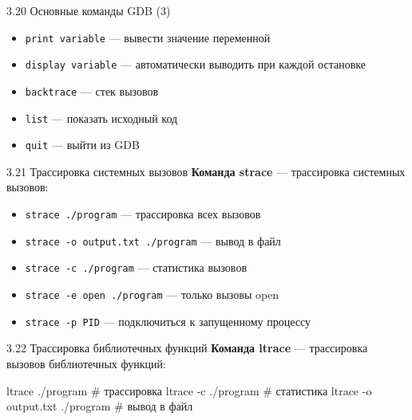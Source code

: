 \documentclass[
  ignorenonframetext,
  aspectratio=169,
  russian,
]{beamer}
\newenvironment{Shaded}{\begin{snugshade}}{\end{snugshade}}
\newcommand{\AttributeTok}[1]{\textcolor[rgb]{0.40,0.45,0.13}{#1}}
\newcommand{\CommentTok}[1]{\textcolor[rgb]{0.37,0.37,0.37}{#1}}
\newcommand{\ExtensionTok}[1]{\textcolor[rgb]{0.00,0.23,0.31}{#1}}
\newcommand{\NormalTok}[1]{\textcolor[rgb]{0.00,0.23,0.31}{#1}}
\providecommand{\tightlist}{%
  \setlength{\itemsep}{0pt}\setlength{\parskip}{0pt}}
\begin{document}
\begin{frame}[fragile]{3.20 Основные команды GDB (3)}
\label{ux43eux441ux43dux43eux432ux43dux44bux435-ux43aux43eux43cux430ux43dux434ux44b-gdb-3}
\begin{itemize}[<+->]
\tightlist
\item
  \texttt{print\ variable} --- вывести значение переменной
\item
  \texttt{display\ variable} --- автоматически выводить при каждой
  остановке
\item
  \texttt{backtrace} --- стек вызовов
\item
  \texttt{list} --- показать исходный код
\item
  \texttt{quit} --- выйти из GDB
\end{itemize}
\end{frame}

\begin{frame}[fragile]{3.21 Трассировка системных вызовов}
\label{ux442ux440ux430ux441ux441ux438ux440ux43eux432ux43aux430-ux441ux438ux441ux442ux435ux43cux43dux44bux445-ux432ux44bux437ux43eux432ux43eux432}
\textbf{Команда strace} --- трассировка системных вызовов:

\begin{itemize}[<+->]
\tightlist
\item
  \texttt{strace\ ./program} --- трассировка всех вызовов
\item
  \texttt{strace\ -o\ output.txt\ ./program} --- вывод в файл
\item
  \texttt{strace\ -c\ ./program} --- статистика вызовов
\item
  \texttt{strace\ -e\ open\ ./program} --- только вызовы open
\item
  \texttt{strace\ -p\ PID} --- подключиться к запущенному процессу
\end{itemize}
\end{frame}

\begin{frame}[fragile]{3.22 Трассировка библиотечных функций}
\label{ux442ux440ux430ux441ux441ux438ux440ux43eux432ux43aux430-ux431ux438ux431ux43bux438ux43eux442ux435ux447ux43dux44bux445-ux444ux443ux43dux43aux446ux438ux439}
\textbf{Команда ltrace} --- трассировка вызовов библиотечных функций:

\begin{Shaded}
\begin{Highlighting}[]
\ExtensionTok{ltrace}\NormalTok{ ./program               }\CommentTok{\# трассировка}
\ExtensionTok{ltrace} \AttributeTok{{-}c}\NormalTok{ ./program            }\CommentTok{\# статистика}
\ExtensionTok{ltrace} \AttributeTok{{-}o}\NormalTok{ output.txt ./program }\CommentTok{\# вывод в файл}
\end{Highlighting}
\end{Shaded}
\end{frame}
\end{document}
